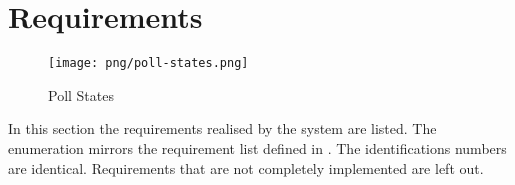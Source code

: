 \section{Requirements}
\label{requirements}

\begin{figure}[h]
\centering
\texttt{[image: png/poll-states.png]}
\caption{Poll States}
\end{figure}

In this section the requirements realised by the system are listed. The enumeration mirrors the requirement list defined in \cite{Votes14}. The identifications numbers are identical. Requirements that are not completely implemented are left out.


